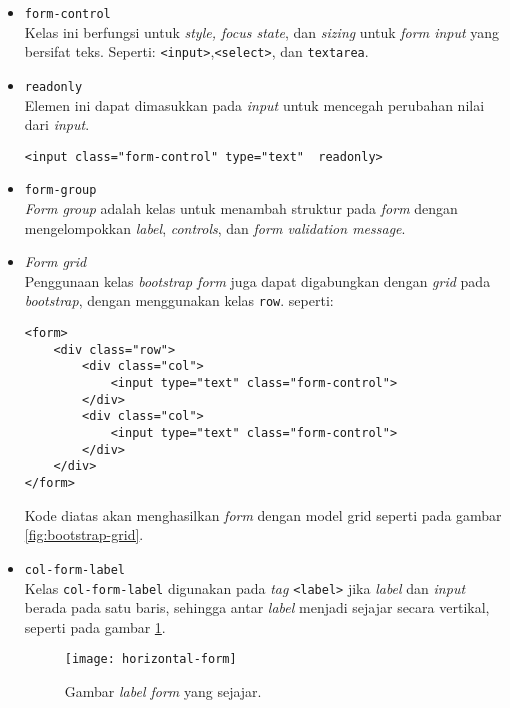 \begin{itemize}
	\item \texttt{form-control} \\
	Kelas ini berfungsi untuk \textit{style, focus state}, dan \textit{sizing} untuk \textit{form input} yang bersifat teks. Seperti: \texttt{<input>},\texttt{<select>}, dan \texttt{textarea}.
	
	\item \texttt{readonly} \\
	Elemen ini dapat dimasukkan pada \textit{input} untuk mencegah perubahan nilai dari \textit{input}.			
	\begin{lstlisting}
<input class="form-control" type="text"  readonly>	
	\end{lstlisting}
	
	\item \texttt{form-group} \\
	\textit{Form group} adalah kelas untuk menambah struktur pada \textit{form} dengan mengelompokkan \textit{label}, \textit{controls}, dan \textit{form validation message}. 
	
	\item \textit{Form grid} \\
	Penggunaan kelas \textit{bootstrap form} juga dapat digabungkan dengan \textit{grid} pada \textit{bootstrap}, dengan menggunakan kelas \texttt{row}. seperti:
\begin{lstlisting}
<form>
	<div class="row">
		<div class="col">
			<input type="text" class="form-control">
		</div>
		<div class="col">
			<input type="text" class="form-control">
		</div>
	</div>
</form>
\end{lstlisting}
Kode diatas akan menghasilkan \textit{form} dengan model grid seperti pada gambar \ref{fig:bootstrap-grid}.

\item \texttt{col-form-label} \\ 
Kelas \texttt{col-form-label} digunakan pada \textit{tag} \texttt{<label>} jika \textit{label} dan \textit{input} berada pada satu baris, sehingga antar \textit{label} menjadi sejajar secara vertikal, seperti pada gambar \ref{fig:horizontal-form}.
\begin{figure}[H]
	\centering
	\texttt{[image: horizontal-form]}  	
	\caption[Gambar bootstrap-grid]{Gambar \textit{label form} yang sejajar.}
	\label{fig:horizontal-form}  
\end{figure}

\end{itemize}

